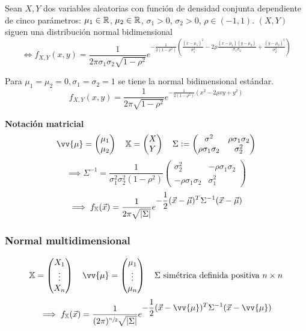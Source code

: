 \begin{ejem}
	Sean $X, Y$ dos variables aleatorias con función de densidad conjunta dependiente de cinco parámetros: $\mu_1\in\mathbb{R}$, $\mu_2\in\mathbb{R}$, $\sigma_1>0$, $\sigma_2>0$, $\rho\in (-1, 1)$. $(X, Y)$ siguen una distribución normal bidimensional
	\[\iff f_{X, Y}(x, y) = \frac{1}{2\pi \sigma_1 \sigma_2 \sqrt{1-\rho^2}} e^{-\frac{1}{2(1-\rho^2)}\left(\frac{(x-\mu_1)^2}{\sigma_1^2} - 2\rho\frac{(x-\mu_1)(y-\mu_2)}{\sigma_1\sigma_2} + \frac{(y-\mu_2)^2}{\sigma_2^2}\right)}\]

	Para $\mu_1 = \mu_2 = 0, \sigma_1 = \sigma_2 = 1$ se tiene la normal bidimensional estándar.
	\[f_{X, Y}(x, y) = \frac{1}{2\pi \sqrt{1-\rho^2}} e^{-\frac{1}{2(1-\rho^2)}\left(x^2 - 2\rho x y + y^2\right)}\]

	\textbf{Notación matricial}
	\[\vv{\mu} = \begin{pmatrix}
			\mu_1 \\
			\mu_2
		\end{pmatrix} \quad \mathbb{X} = \begin{pmatrix}
			X \\
			Y
		\end{pmatrix} \quad \Sigma \defeq \begin{pmatrix}
			\sigma^2               & \rho \sigma_1 \sigma_2 \\
			\rho \sigma_1 \sigma_2 & \sigma_2^2
		\end{pmatrix}\]
	\[\implies \Sigma^{-1} = \frac{1}{\sigma_1^2\sigma_2^2(1 - \rho^2)} \begin{pmatrix}
			\sigma_2^2              & -\rho \sigma_1 \sigma_2 \\
			-\rho \sigma_1 \sigma_2 & \sigma_1^2
		\end{pmatrix}\]
	\[\implies f_\mathbb{X}(\vec{x}) = \frac{1}{2\pi \sqrt{\left|\Sigma\right|}} e^{\displaystyle -\frac{1}{2} (\vec{x} - \vec{\mu})^T \Sigma^{-1} (\vec{x} - \vec{\mu})}\]
\end{ejem}

\subsubsection{Normal multidimensional}
\[\mathbb{X} = \begin{pmatrix}
		X_1    \\
		\vdots \\
		X_n
	\end{pmatrix} \quad \vv{\mu} = \begin{pmatrix}
		\mu_1  \\
		\vdots \\
		\mu_n
	\end{pmatrix} \quad \Sigma \tex{ simétrica definida positiva $n\times n$}\]
\[\implies f_\mathbb{X} (\vec{x})= \frac{1}{(2\pi)^{\sfrac{n}{2}} \sqrt{\abs{\Sigma}}} e^{\ds -\frac{1}{2} (\vec{x} - \vv{\mu})^T \Sigma^{-1} (\vec{x} - \vv{\mu})}\]

